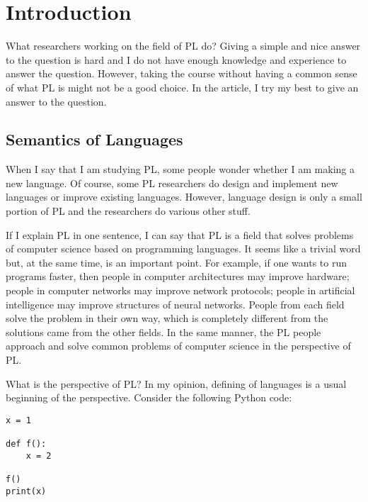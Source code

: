 \setchapterpreamble[u]{\margintoc}
\chapter{Introduction}

What researchers working on the field of PL do? Giving a simple and nice
answer to the question is hard and I do not have enough knowledge and
experience to answer the question. However, taking the course without having a
common sense of what PL is might not be a good choice. In the article, I try
my best to give an answer to the question.

\section{Semantics of Languages}

When I say that I am studying PL, some people wonder whether I am making a new
language. Of course, some PL researchers do design and implement new languages
or improve existing languages. However, language design is only a small
portion of PL and the researchers do various other stuff.

If I explain PL in one sentence, I can say that PL is a field that solves
problems of computer science based on programming languages. It seems like a
trivial word but, at the same time, is an important point. For example, if one
wants to run programs faster, then people in computer architectures may
improve hardware; people in computer networks may improve network protocols;
people in artificial intelligence may improve structures of neural networks.
People from each field solve the problem in their own way, which is completely
different from the solutions came from the other fields. In the same manner,
the PL people approach and solve common problems of computer science in the
perspective of PL.

What is the perspective of PL? In my opinion, defining  of
languages is a usual beginning of the perspective. Consider the following
Python code:

\begin{verbatim}
x = 1

def f():
    x = 2

f()
print(x)
\end{verbatim}

